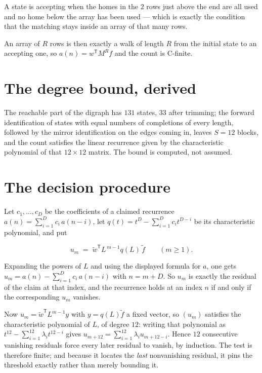 \documentclass[11pt]{article}
\theoremstyle{definition}
\begin{document}
A state is accepting when the homes in the $2$ rows just above the end are all used and no home below the array has been used --- which is exactly the condition that the matching stays inside an array of that many rows.

An array of $R$ rows is then exactly a walk of length $R$ from the initial state to an accepting one, so $a(n) = w^{\mathsf T}M^{R}f$ and the count is C-finite.

\section{The degree bound, derived}

The reachable part of the digraph has $131$ states, $33$ after trimming; the forward identification of states with equal numbers of completions of every length, followed by the mirror identification on the edges coming in, leaves $S = 12$ blocks, and the count satisfies the linear recurrence given by the characteristic polynomial of that $12\times12$ matrix. The bound is computed, not assumed.

\section{The decision procedure}

Let $c_1,\dots,c_D$ be the coefficients of a claimed recurrence $a(n) = \sum_{i=1}^{D} c_i\,a(n-i)$, let $q(t) = t^{D} - \sum_{i=1}^{D} c_i t^{D-i}$ be its characteristic polynomial, and put

\[u_m \;=\; \tilde w^{\mathsf T} L^{\,m-1} q(L)\,\tilde f \qquad (m \ge 1).\]

Expanding the powers of $L$ and using the displayed formula for $a$, one gets $u_m = a(n) - \sum_{i=1}^{D} c_i\,a(n-i)$ with $n = m + D$. So $u_m$ is exactly the residual of the claim at that index, and the recurrence holds at an index $n$ if and only if the corresponding $u_m$ vanishes.

Now $u_m = \tilde w^{\mathsf T} L^{m-1} y$ with $y = q(L)\tilde f$ a fixed vector, so $(u_m)$ satisfies the characteristic polynomial of $L$, of degree $12$: writing that polynomial as $t^{12} - \sum_{i=1}^{12} \lambda_i t^{12-i}$ gives $u_{m+12} = \sum_{i=1}^{12} \lambda_i u_{m+12-i}$. Hence $12$ consecutive vanishing residuals force every later residual to vanish, by induction. The test is therefore finite; and because it locates the {\itshape last} nonvanishing residual, it pins the threshold exactly rather than merely bounding it.
\end{document}

